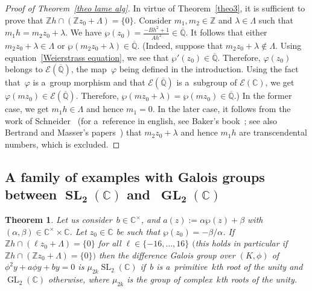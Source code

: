 \documentclass[pdftex]{sigma}
\numberwithin{equation}{section}
\newtheorem{Theorem}{Theorem}[section]
\begin{document}
\begin{proof}[Proof of Theorem~\ref{theo lame alg}]
In virtue of Theorem~\ref{theo3}, it is suf\/f\/icient to prove that $\mathbb Z h
\cap (\mathbb Z z_{0} + \Lambda)=\{0\}$.
Consider $m_{1},m_{2}\in \mathbb Z$ and $\lambda \in \Lambda$ such that $m_{1}h=m_{2}z_{0}+\lambda$.
We have $\wp(z_{0})=\frac{-Bh^{2}+1}{A h^{2}} \in \overline{\mathbb{Q}}$.
It follows that either $m_{2}z_{0}+\lambda \in \Lambda$ or $\wp(m_{2}z_{0}+\lambda) \in \overline{\mathbb{Q}}$.
(Indeed, suppose that $m_{2}z_{0}+\lambda \not \in \Lambda$.
Using equation~\eqref{Weierstrass equation}, we see that $\wp'(z_{0}) \in \overline{\mathbb{Q}}$.
Therefore, $\varphi(z_{0})$ belongs to $ \mathcal{E}(\overline{\mathbb{Q}})$, the map~$\varphi$ being def\/ined in the
introduction.
Using the fact that~$\varphi$ is a~group morphism and that $\mathcal{E}(\overline{\mathbb{Q}})$ is a~subgroup of
$\mathcal{E}(\mathbb C)$, we get $\varphi(mz_{0}) \in \mathcal{E}(\overline{\mathbb{Q}})$.
Therefore, $\wp(mz_{0}+\lambda)=\wp(mz_{0}) \in \overline{\mathbb{Q}}$.) In the former case, we get $m_{1}h\in \Lambda$
and hence $m_{1}=0$.
In the later case, it follows from the work of Schneider~\cite{schneider} (for a~reference in english, see Baker's
book~\cite[Theorem 6.2]{BakerTNT}; see also Bertrand and Masser's papers~\cite{BerMas,Mas75}) that $m_{2}z_{0}+\lambda$
and hence $m_{1}h$ are transcendental numbers, which is excluded.
\end{proof}

\subsection[A family of examples with Galois groups between $\operatorname{SL}
_{2}(\mathbb C)$ and~$\operatorname{GL}_{2}(\mathbb C)$]{A family of examples with Galois groups between $\boldsymbol{\operatorname{SL}
_{2}(\mathbb C)}$ and~$\boldsymbol{\operatorname{GL}_{2}(\mathbb C)}$}

\begin{Theorem}
\label{theo je ne sais plus combien}
Let us consider~$b\in \mathbb C^{\times}$, and $a(z):=\alpha \wp(z) + \beta$ with ${(\alpha,\beta) \in \mathbb
C^{\times}\times \mathbb C}$.
Let $z_0 \in \mathbb C$ be such that $\wp(z_0)=-\beta/\alpha$.
If $\mathbb Z h \cap (\ell z_{0} + \Lambda)=\{0\}$ for all $\ell \in \{-16,\dots,16\}$ $($this holds in particular if
$\mathbb Z h \cap (\mathbb Z z_{0} + \Lambda)=\{0\})$ then the difference Galois group over $(K,\phi)$ of $\phi^2 y
+a\phi y+by=0$ is $\mu_{2k} \operatorname{SL}_{2}(\mathbb C)$ if~$b$ is a~primitive~$k$th root of the unity and
$\operatorname{GL}_{2}(\mathbb C)$ otherwise, where $\mu_{2k}$ is the group of complex~$k$th roots of the unity.
\end{Theorem}
\end{document}
